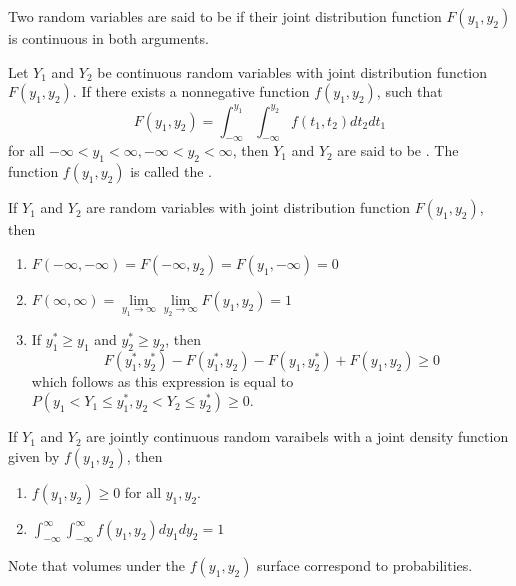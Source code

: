 \documentclass[12pt, a4paper, twoside, openright, titlepage]{book}
\begin{document}
Two random variables are said to be  if their joint distribution function $F(y_1,y_2)$ is continuous in both arguments.

\begin{defn}{}{}
    Let $Y_1$ and $Y_2$ be continuous random variables with joint distribution function $F(y_1,y_2)$. If there exists a nonnegative function $f(y_1,y_2)$, such that \begin{equation*}
        F(y_1,y_2) = \int_{-\infty}^{y_1}\int_{-\infty}^{y_2}f(t_1,t_2)dt_2dt_1
    \end{equation*}
    for all $-\infty < y_1 < \infty, -\infty < y_2 < \infty$, then $Y_1$ and $Y_2$ are said to be . The function $f(y_1,y_2)$ is called the .
\end{defn}

\begin{thm}{}{}
    If $Y_1$ and $Y_2$ are random variables with joint distribution function $F(y_1,y_2)$, then \begin{enumerate}
        \item $F(-\infty,-\infty) = F(-\infty,y_2) = F(y_1,-\infty) = 0$
        \item $F(\infty,\infty) = \lim\limits_{y_1\rightarrow \infty}\lim\limits_{y_2\rightarrow \infty}F(y_1,y_2) = 1$
        \item If $y_1^* \geq y_1$ and $y_2^* \geq y_2$, then \begin{equation*}
                F(y_1^*,y_2^*) - F(y_1^*,y_2) - F(y_1,y_2^*) + F(y_1,y_2) \geq 0
        \end{equation*}
            which follows as this expression is equal to $P(y_1 < Y_1\leq y_1^*, y_2 < Y_2 \leq y_2^*) \geq 0$.
    \end{enumerate}
\end{thm}

\begin{thm}{}{}
    If $Y_1$ and $Y_2$ are jointly continuous random varaibels with a joint density function given by $f(y_1,y_2)$, then \begin{enumerate}
        \item $f(y_1,y_2) \geq 0$ for all $y_1,y_2$.
        \item $\int_{-\infty}^{\infty}\int_{-\infty}^{\infty}f(y_1,y_2)dy_1dy_2 = 1$
    \end{enumerate}
\end{thm}

Note that volumes under the $f(y_1,y_2)$ surface correspond to probabilities.
\end{document}
